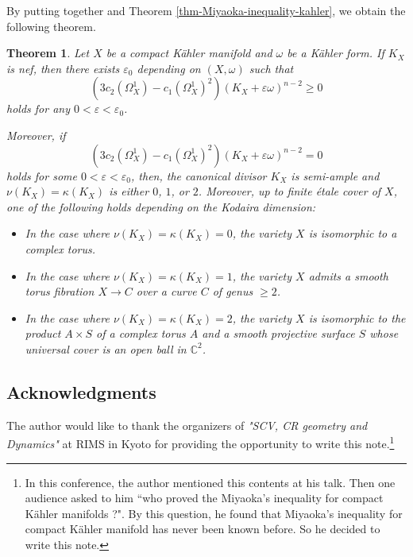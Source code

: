 \documentclass[12pt]{amsart}
\newtheorem{thm}{Theorem}[section]
\theoremstyle{definition}
\theoremstyle{remark}
\numberwithin{equation}{section}
\begin{document}
By putting together \cite{IM22} and Theorem \ref{thm-Miyaoka-inequality-kahler}, we obtain the following theorem.
\begin{thm}
Let $X$ be a compact K\"ahler manifold and $\omega$ be a K\"ahler form.
If $K_X$ is nef, then there exists $\varepsilon_{0}$ depending on $(X, \omega)$ such that 
\begin{equation}
\left( 3c_2(\Omega_{X}^{1}) - c_{1} (\Omega_{X}^{1})^2\right)(K_{X} + \varepsilon \omega)^{n-2}\ge 0
\end{equation}
holds for any $0 < \varepsilon < \varepsilon_{0}$.

Moreover, 
if 
$$\left( 3c_2(\Omega_{X}^{1}) - c_{1} (\Omega_{X}^{1})^2 \right)(K_{X} + \varepsilon \omega)^{n-2} = 0$$
 holds for some $0 < \varepsilon < \varepsilon_{0}$, then, the canonical divisor $K_X$ is semi-ample and $\nu(K_{X})=\kappa(K_{X})$ is either $0$, $1$, or $2$. 
Moreover, up to finite \'etale cover of $X$, one of the following holds depending on the Kodaira dimension:
\begin{itemize}
\item[$(i)$] In the case where $\nu(K_{X})=\kappa(K_{X})=0$, 
the variety $X$ is isomorphic to a complex torus. 

\item[$(ii)$] In the case where $\nu(K_{X})=\kappa(K_{X})=1$, 
the variety $X$ admits a smooth torus fibration $X \rightarrow C$ over a curve $C$ of genus $\ge 2$.

\item[$(iii)$] In the case where $\nu(K_{X})=\kappa(K_{X})=2$, the variety $X$ is isomorphic to the product $A \times S$ of a complex torus $A$ 
and a smooth projective surface $S$ whose universal cover is an open ball in $\mathbb{C}^{2}$. 
\end{itemize}
\end{thm}

\subsection*{Acknowledgments}
The author would like to thank the organizers of \textit{"SCV, CR geometry and Dynamics"} at RIMS in Kyoto for providing the opportunity to write this note.\footnote{In this conference, the author mentioned this contents at his talk. Then one audience asked to him “who proved the Miyaoka's inequality for compact K\"ahler manifolds ?". By this question, he found that Miyaoka's inequality for compact K\"ahler manifold has never been known before. So he decided to write this note. }



\end{document}
